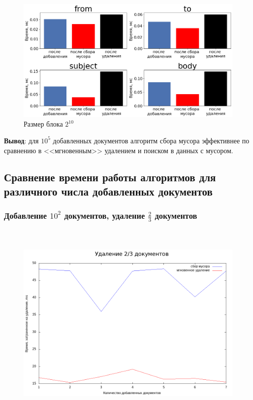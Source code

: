 \begin{figure}[H]
\includegraphics[width=\linewidth]{fig/limit_1/1e5/search.png}
\caption{Размер блока $2^{10}$}
\end{figure}

\textbf{Вывод}: для $10^5$ добавленных документов алгоритм сбора мусора эффективнее
по сравнению в <<мгновенным>> удалением и поиском в данных с мусором.

\newpage
\subsection{Сравнение времени работы алгоритмов для различного числа добавленных документов}

\subsubsection{Добавление $10^2$ документов, удаление $\frac{2}{3}$ документов}

\begin{figure}[H]
\includegraphics[width=\linewidth, height=10cm]{fig/time_1e2.png}
\end{figure}

